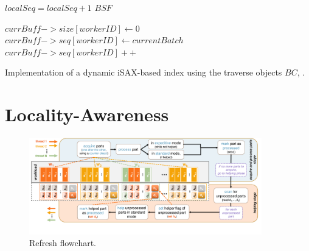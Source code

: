 \documentclass[a4paper,11pt,twoside,openany]{book}
\newcommand{\BC}{\mbox{$\mathit{BC}$}}
\begin{document}
\begin{algorithm}[htbp]
\begin{algorithmic}[1]
                \State $\mathit{localSeq} = \mathit{localSeq} + 1$            
            \EndIf
        \EndWhile
        \State \Return $\mathit{BSF}$
    \EndProcedure
    
    \vspace*{1mm}
     \label{alg:BufferReuse}

        \State $\mathit{currBuff->size[workerID]} \gets 0$
            \State $\mathit{currBuff->seq[workerID]} \gets \mathit{currentBatch}$
        \EndIf
        \State $\mathit{currBuff->seq[workerID]++}$
    \EndProcedure
    
    \end{algorithmic}
    
    \caption{Implementation of a dynamic iSAX-based index using the traverse objects \BC, \TP.}
    \label{alg:DynamiciTraverseObject}
    \end{algorithm}



\chapter{Locality-Awareness}
\label{chapter:Locality-aware}

\begin{figure}[tb]
	\centering
	\includegraphics[width=0.9\textwidth]{figures/locality-aware/Refresh_ekosmas_2-Themis.pdf}	
	\vspace*{-0.8cm}
	\caption{Refresh flowchart.}
	\vspace*{-0.2cm}
	\label{fig:refresh:flowchart}
\end{figure}
\end{document}
